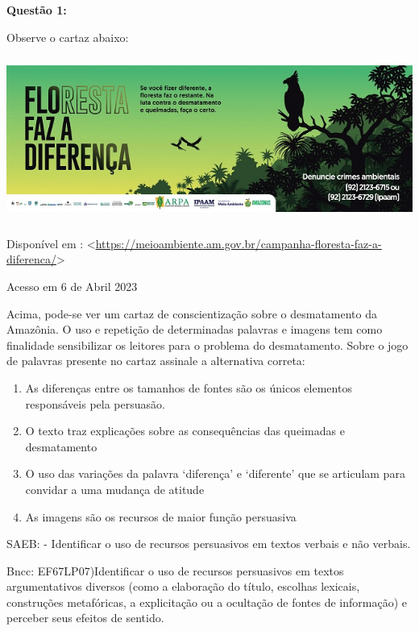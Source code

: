 {\textbf{Questão 1:}

Observe o cartaz abaixo:

\includegraphics[width=5.90551in,height=2.125in]{./imgSAEB_7_POR/media/image16.png}

Disponível em :
\textless{}\href{https://meioambiente.am.gov.br/campanha-floresta-faz-a-diferenca/}{\uline{https://meioambiente.am.gov.br/campanha-floresta-faz-a-diferenca/}}\textgreater{}

Acesso em 6 de Abril 2023

Acima, pode-se ver um cartaz de conscientização sobre o desmatamento da
Amazônia. O uso e repetição de determinadas palavras e imagens tem como
finalidade sensibilizar os leitores para o problema do desmatamento.
Sobre o jogo de palavras presente no cartaz assinale a alternativa
correta:

\begin{enumerate}
\def\labelenumi{\alph{enumi})}
\item
  As diferenças entre os tamanhos de fontes são os únicos elementos
  responsáveis pela persuasão.
\item
  O texto traz explicações sobre as consequências das queimadas e
  desmatamento
\item
  O uso das variações da palavra `diferença' e `diferente' que se
  articulam para convidar a uma mudança de atitude
\item
  As imagens são os recursos de maior função persuasiva
\end{enumerate}

SAEB: - Identificar o uso de recursos persuasivos em textos verbais e
não verbais.

Bncc: EF67LP07)Identificar o uso de recursos persuasivos em textos
argumentativos diversos (como a elaboração do título, escolhas lexicais,
construções metafóricas, a explicitação ou a ocultação de fontes de
informação) e perceber seus efeitos de sentido.

}
